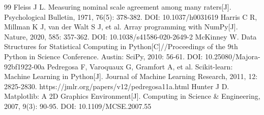 \documentclass[bwprint]{gmcmthesis}
\begin{document}
\begin{thebibliography}{99}
 Fleiss J L. Measuring nominal scale agreement among many raters[J]. Psychological Bulletin, 1971, 76(5): 378-382. DOI: 10.1037/h0031619
 Harris C R, Millman K J, van der Walt S J, et al. Array programming with NumPy[J]. Nature, 2020, 585: 357-362. DOI: 10.1038/s41586-020-2649-2
 McKinney W. Data Structures for Statistical Computing in Python[C]//Proceedings of the 9th Python in Science Conference. Austin: SciPy, 2010: 56-61. DOI: 10.25080/Majora-92bf1922-00a
 Pedregosa F, Varoquaux G, Gramfort A, et al. Scikit-learn: Machine Learning in Python[J]. Journal of Machine Learning Research, 2011, 12: 2825-2830. https://jmlr.org/papers/v12/pedregosa11a.html
 Hunter J D. Matplotlib: A 2D Graphics Environment[J]. Computing in Science \& Engineering, 2007, 9(3): 90-95. DOI: 10.1109/MCSE.2007.55
\end{thebibliography}
\label{body:end}
\end{document}
